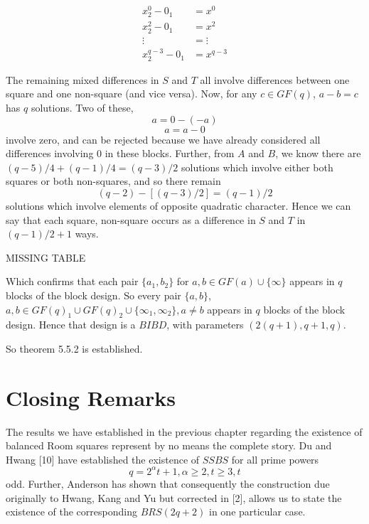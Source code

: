 \documentclass[
  11pt,
  a4paper]{book}
\begin{document}
\begin{align*}
  x_2^0       -0_1   &= x^0 \\
  x_2^2       -0_1   &= x^2 \\
    \vdots           &= \vdots \\         
  x^{q-3}_2   -0_1   &= x^{q-3}
\end{align*}

The remaining mixed differences in \(S\) and \(T\) all involve
differences between one square and one non-square (and vice
versa). Now, for any \(c \in GF(q)\), \(a - b = c\) has \(q\)
solutions. Two of these,
\[a = 0 - (-a)\]
\[a = a - 0\]
involve zero, and can be rejected because we have already
considered all differences involving 0 in these blocks.
Further, from \(A\) and \(B\), we know there are
\((q - 5)/4 + (q - 1)/4 = (q - 3)/2\) solutions which involve
either both squares or both non-squares, and so there remain
\[(q - 2) - [(q - 3)/2] = (q - 1)/2\]
solutions which involve elements of opposite quadratic
character. Hence we can say that each square, non-square
occurs as a difference in \(S\) and \(T\) in \((q - 1)/2 + 1\) ways.

MISSING TABLE

Which confirms that each pair \(\{a_1, b_2\}\) for \(a, b \in GF(a) \cup \{\infty\}\) appears in \(q\) blocks of the block
design. So every pair \(\{a, b\}\),
\(a, b \in GF(q)_1 \cup GF(q)_2 \cup \{\infty _1, \infty _2\}, a \neq b\)
appears in \(q\) blocks of the block design. Hence that design
is a \(BIBD\), with parameters \((2(q + 1), q + 1, q)\).

So theorem 5.5.2 is established.

\hypertarget{closing-remarks}{%
\chapter{Closing Remarks}\label{closing-remarks}}

The results we have established in the previous chapter regarding the
existence of balanced Room squares represent by no means the complete
story. Du and Hwang {[}10{]} have established the existence of \(SSBS\) for
all prime powers \[q = 2^{\alpha}t+1, \alpha \geq 2, t \geq 3, t\] odd.
Further, Anderson has shown that consequently the construction due
originally to Hwang, Kang and Yu but corrected in {[}2{]}, allows us to
state the existence of the corresponding \(BRS(2q+2)\) in one particular
case.
\end{document}
